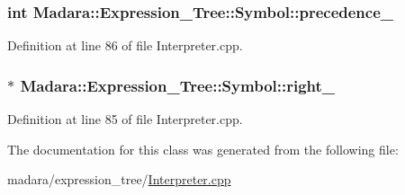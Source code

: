 \hypertarget{classMadara_1_1Expression__Tree_1_1Symbol_a2de31139261eea47dccd48d377780803}{
\subsubsection[{precedence\_\-}]{\setlength{\rightskip}{0pt plus 5cm}int {\bf Madara::Expression\_\-Tree::Symbol::precedence\_\-}}}
\label{d5/d85/classMadara_1_1Expression__Tree_1_1Symbol_a2de31139261eea47dccd48d377780803}


Definition at line 86 of file Interpreter.cpp.

\hypertarget{classMadara_1_1Expression__Tree_1_1Symbol_a13467d1c78fbf06c3d64a6a4770eee7a}{
\subsubsection[{right\_\-}]{$\ast$ {\bf Madara::Expression\_\-Tree::Symbol::right\_\-}}}
\label{d5/d85/classMadara_1_1Expression__Tree_1_1Symbol_a13467d1c78fbf06c3d64a6a4770eee7a}


Definition at line 85 of file Interpreter.cpp.



The documentation for this class was generated from the following file:\begin{DoxyCompactItemize}
\item 
madara/expression\_\-tree/\hyperlink{Interpreter_8cpp}{Interpreter.cpp}\end{DoxyCompactItemize}
